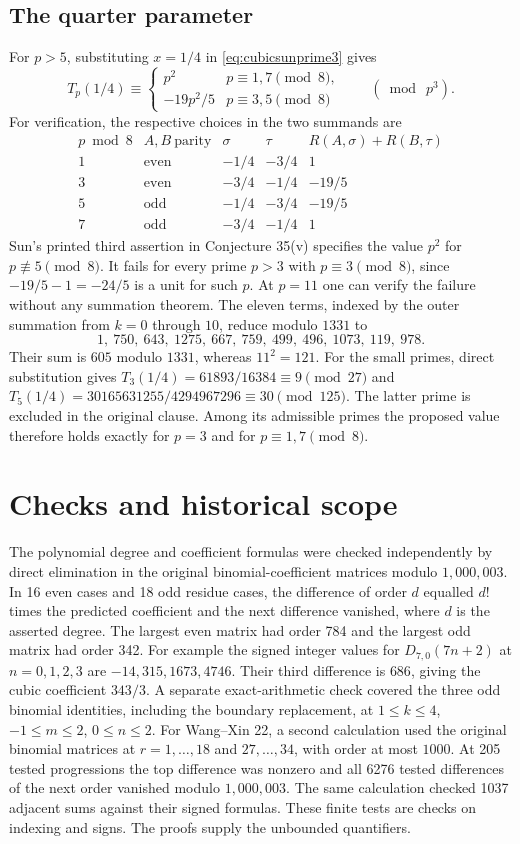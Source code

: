 \documentclass[11pt,a4paper]{article}
\begin{document}
\subsection*{The quarter parameter}
For $p>5$, substituting $x=1/4$ in \eqref{eq:cubicsunprime3} gives
\[
 T_p(1/4)\equiv
 \begin{cases}
 p^2 & p\equiv1,7\pmod 8,\\
 -19p^2/5& p\equiv3,5\pmod 8
 \end{cases}\qquad(\bmod\ p^3).
\]
For verification, the respective choices in the two summands are
\[
\begin{array}{c|c|cc|c}
 p\bmod8&A,B\ \text{parity}&\sigma&\tau&
 R(A,\sigma)+R(B,\tau)\\ \hline
 1&\text{even}&-1/4&-3/4&1\\
 3&\text{even}&-3/4&-1/4&-19/5\\
 5&\text{odd}&-1/4&-3/4&-19/5\\
 7&\text{odd}&-3/4&-1/4&1
\end{array}
\]
Sun's printed third assertion in Conjecture 35(v) specifies the value $p^2$ for $p\not\equiv5\pmod8$. It fails for every prime $p>3$ with $p\equiv3\pmod8$, since $-19/5-1=-24/5$ is a unit for such $p$. At $p=11$ one can verify the failure without any summation theorem. The eleven terms, indexed by the outer summation from $k=0$ through $10$, reduce modulo $1331$ to
\[
 1,\ 750,\ 643,\ 1275,\ 667,\ 759,\ 499,\ 496,\ 1073,\ 119,\ 978.
\]
Their sum is $605$ modulo $1331$, whereas $11^2=121$.
For the small primes, direct substitution gives
$T_3(1/4)=61893/16384\equiv9\pmod{27}$ and
$T_5(1/4)=30165631255/4294967296\equiv30\pmod{125}$.
The latter prime is excluded in the original clause. Among its admissible primes the proposed value therefore holds exactly for $p=3$ and for $p\equiv1,7\pmod8$.

\section*{Checks and historical scope}
The polynomial degree and coefficient formulas were checked independently by direct elimination in the original binomial-coefficient matrices modulo $1{,}000{,}003$. In 16 even cases and 18 odd residue cases, the difference of order $d$ equalled $d!$ times the predicted coefficient and the next difference vanished, where $d$ is the asserted degree. The largest even matrix had order 784 and the largest odd matrix had order 342. For example the signed integer values for $D_{7,0}(7n+2)$ at $n=0,1,2,3$ are $-14,315,1673,4746$. Their third difference is $686$, giving the cubic coefficient $343/3$. A separate exact-arithmetic check covered the three odd binomial identities, including the boundary replacement, at $1\le k\le4$, $-1\le m\le2$, $0\le n\le2$. For Wang--Xin 22, a second calculation used the original binomial matrices at $r=1,\ldots,18$ and $27,\ldots,34$, with order at most $1000$. At 205 tested progressions the top difference was nonzero and all 6276 tested differences of the next order vanished modulo $1{,}000{,}003$. The same calculation checked 1037 adjacent sums against their signed formulas. These finite tests are checks on indexing and signs. The proofs supply the unbounded quantifiers.
\end{document}
